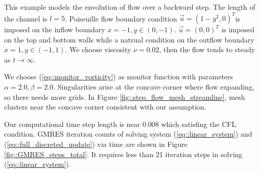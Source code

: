 \documentclass{eajam}
\begin{document}
      This example models the envolution of flow over a backward step.
      The length of the channel is $l = 5$. Poiseuille flow boundary
      condition $\vec{u} = (1 - y^2, 0)^T$is imposed on the inflow
      boundary $x = -1, y \in (0, -1)$. $\vec{u} = (0, 0)^T$ is imposed
      on the top and bottom walls while a natrual condition on the
      outflow boundary $x = 1, y \in (-1, 1)$. We choose viscosity
      $\nu = 0.02$, then the flow tends to steady as $t \rightarrow
      \infty$.
      
      We choose (\ref{eq::monitor_vorticity}) as monitor function
      with parameters $\alpha = 2.0, \beta = 2.0$. Singularities arise
      at the concave corner where flow expanding, so there needs more
      grids. In Figure \ref{fig::step_flow_mesh_streamline}, mesh
      clusters near the concave corner consistent with our assumption. 
      
      Our computational time step length is near $0.008$ which
      satisfing the CFL condition. GMRES iteration counts of solving
      system (\ref{eq::linear_system}) and
      (\ref{eq::full_discreted_update}) via time are shown in
      Figure \ref{fig::GMRES_steps_total}. It requires less than 21
      iteration steps in solving (\ref{eq::linear_system}). 
 
\end{document}
